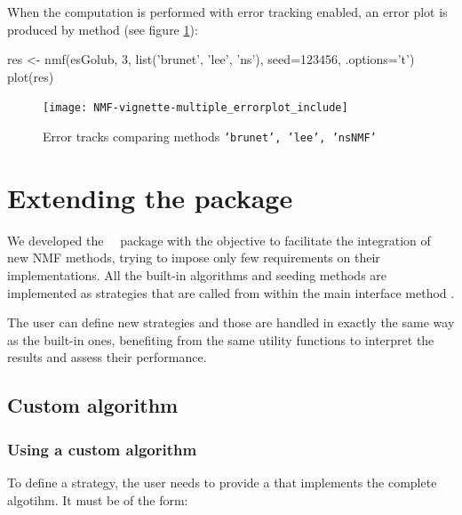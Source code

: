 \documentclass[a4paper]{article}
\newcommand{\nmfpack}{\code{NMF}\ }
\begin{document}
When the computation is performed with error tracking enabled, an error plot is 
produced by method  (see figure \ref{fig:multi_error}):

\begin{Schunk}
\begin{Sinput}
 res <- nmf(esGolub, 3, list('brunet', 'lee', 'ns'), seed=123456, .options='t')
 plot(res)
\end{Sinput}
\end{Schunk}

\begin{figure}[ht]
\centering
\texttt{[image: NMF-vignette-multiple\_errorplot\_include]}
\caption{Error tracks comparing methods \texttt{'brunet', 'lee', 'nsNMF'}}
\label{fig:multi_error}
\end{figure}


 
\section{Extending the package}

We developed the \nmfpack\ package with the objective to facilitate the integration 
of new NMF methods, trying to impose only few requirements on their implementations. 
All the built-in algorithms and seeding methods are implemented as strategies 
that are called from within the main interface method . 

The user can define new strategies and those are handled in exactly the same way as 
the built-in ones, benefiting from the same utility functions to interpret the 
results and assess their performance. 

\subsection{Custom algorithm}
%
%

\subsubsection{Using a custom algorithm}\label{sec:algo_custom}
To define a strategy, the user needs to provide a  that 
implements the complete algotihm. It must be of the form: 
\end{document}
